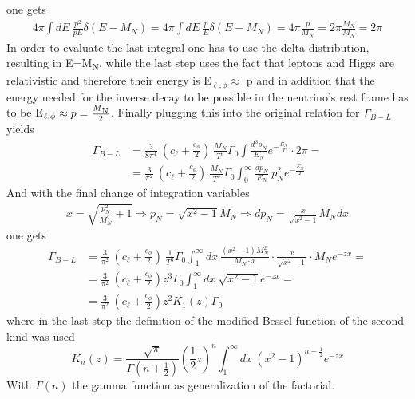 one gets
\begin{align*}
	4\pi\int dE\: \frac{p^2}{pE}\delta\left(E-M_N\right)=4\pi\int dE\: \frac{p}{E}\delta\left(E-M_N\right)=4\pi\frac{p}{M_N}=2\pi \frac{M_N}{M_N}=2\pi
\end{align*}
In order to evaluate the last integral one has to use the delta distribution, resulting in E=M\textsubscript{N}, while the last step uses the fact that leptons and Higgs are relativistic and therefore their energy is E$_{\ell,\phi}\approx$ p and in addition that the energy needed for the inverse decay to be possible in the neutrino's rest frame has to be E$_{\ell,\phi}\approx p=\frac{M\textsubscript{N}}{2}$. Finally plugging this into the original relation for $\Gamma_{B-L}$ yields
\begin{align*}
	\Gamma_{B-L}&=\frac{3}{8\pi^4}\:\left(c_\ell+\frac{c_\phi}{2}\right)\:\frac{M_N}{T^3}\Gamma_0\int \frac{d^3p_N}{E_N}e^{-\frac{E_N}{T}} \cdot 2\pi=\\
	&=\frac{3}{\pi^2}\:\left(c_\ell+\frac{c_\phi}{2}\right)\:\frac{M_N}{T^3}\Gamma_0\int_0^\infty \frac{dp_N}{E_N}\:p_N^2e^{-\frac{E_N}{T}}
\end{align*}
And with the final change of integration variables 
\begin{align*}
	x=\sqrt{\frac{p_N^2}{M_N^2}+1}\Longrightarrow p_N=\sqrt{x^2-1}M_N \Longrightarrow dp_N=\frac{x}{\sqrt{x^2-1}}M_Ndx
\end{align*}
one gets 
\begin{align*}
	\Gamma_{B-L}&=\frac{3}{\pi^2}\:\left(c_\ell+\frac{c_\phi}{2}\right)\:\frac{1}{T^3}\Gamma_0\int_{1}^{\infty}dx\: \frac{\left(x^2-1 \right)M_N^2}{M_N\cdot x}\cdot \frac{x}{\sqrt{x^2-1}}\cdot M_N e^{-zx}=\\
	&=\frac{3}{\pi^2}\:\left(c_\ell+\frac{c_\phi}{2}\right)z^3\Gamma_0\int_{1}^{\infty}dx\: \sqrt{x^2-1}e^{-zx}=\\
	&=\frac{3}{\pi^2}\:\left(c_\ell+\frac{c_\phi}{2}\right)z^2K_1(z)\Gamma_0
\end{align*}
where in the last step the definition of the modified Bessel function of the second kind was used
\begin{equation*}
	K_n(z)=\frac{\sqrt{\pi}}{\Gamma\left(n+\frac{1}{2}\right)}\left(\frac{1}{2}z\right)^n\int_{1}^{\infty}dx\:\left(x^2-1\right)^{n-\frac{1}{2}}e^{-zx}
\end{equation*}
With $\Gamma(n)$ the gamma function as generalization of the factorial.
\newpage
